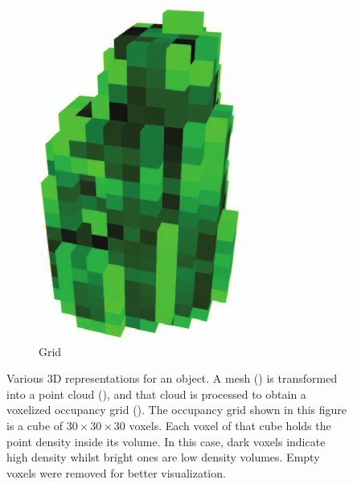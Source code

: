 \begin{figure}[!t]
\begin{subfigure}{0.3\linewidth}
    \includegraphics[width=0.9\linewidth]{Figures/ObjRecog/grid.png}
    \caption{Grid}
    \label{fig:objrecog:meshcloudgrid:grid}
  \end{subfigure}
  \caption{Various 3D representations for an object. A mesh () is transformed into a point cloud (), and that cloud is processed to obtain a voxelized occupancy grid (). The occupancy grid shown in this figure is a cube of $30\times 30 \times 30$ voxels. Each voxel of that cube holds the point density inside its volume. In this case, dark voxels indicate high density whilst bright ones are low density volumes. Empty voxels were removed for better visualization.}
  \label{fig:objrecog:meshcloudgrid}
\end{figure}

